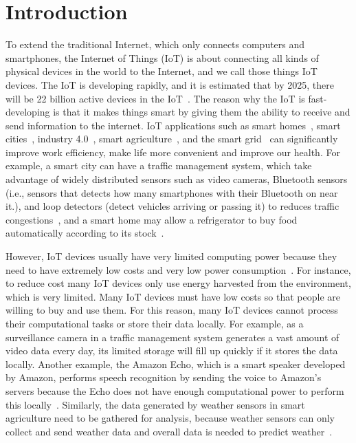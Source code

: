 \documentclass[11pt]{phdthesis}
\begin{document}
\mainmatter
\chapter{Introduction} \label{introduction}

To extend the traditional Internet, which only connects computers and smartphones, the Internet of Things (IoT) is about connecting all kinds of physical devices in the world to the Internet, and we call those things IoT devices. The IoT is developing rapidly, and it is estimated that by 2025, there will be 22 billion active devices in the IoT~\citep{IOTANALYTICS2019}. The reason why the IoT is fast-developing is that it makes things smart by giving them the ability to receive and send information to the internet. IoT applications such as smart homes~\citep{ricquebourg2006smart}, smart cities~\citep{cocchia2014smart}, industry 4.0~\citep{roblek2016complex}, smart agriculture~\citep{tongke2013smart}, and the smart grid~\citep{tuballa2016review} can significantly improve work efficiency, make life more convenient and improve our health. For example, a smart city can have a traffic management system, which take advantage of widely distributed sensors such as video cameras, Bluetooth sensors (i.e., sensors that detects how many smartphones with their Bluetooth on near it.), and loop detectors (detect vehicles arriving or passing it) to reduces traffic congestions~\citep{su2011smart}, and a smart home may allow a refrigerator to buy food automatically according to its stock~\citep{ricquebourg2006smart}. 

However, IoT devices usually have very limited computing power because they need to have extremely low costs and very low power consumption~\citep{chen2014vision}. For instance, to reduce cost many IoT devices only use energy harvested from the environment, which is very limited. Many IoT devices must have low costs so that people are willing to buy and use them. For this reason, many IoT devices cannot process their computational tasks or store their data locally. For example, as a surveillance camera in a traffic management system generates a vast amount of video data every day, its limited storage will fill up quickly if it stores the data locally. Another example, the Amazon Echo, which is a smart speaker developed by Amazon, performs speech recognition by sending the voice to Amazon's servers because the Echo does not have enough computational power to perform this locally~\citep{Alexa}. Similarly, the data generated by weather sensors in smart agriculture need to be gathered for analysis, because weather sensors can only collect and send weather data and overall data is needed to predict weather~\citep{mekala2017survey}.
\end{document}
